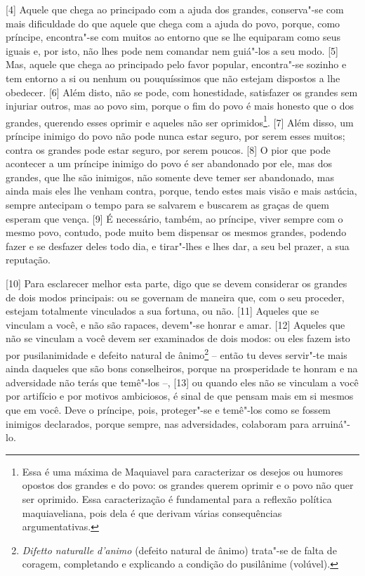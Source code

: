 {[}4{]} Aquele que chega ao principado com a ajuda dos grandes,
conserva"-se com mais dificuldade do que aquele que chega com a ajuda do
povo, porque, como príncipe, encontra"-se com muitos ao entorno que se
lhe equiparam como seus iguais e, por isto, não lhes pode nem comandar
nem guiá"-los a seu modo. {[}5{]} Mas, aquele que chega ao principado
pelo favor popular, encontra"-se sozinho e tem entorno a si ou nenhum ou
pouquíssimos que não estejam dispostos a lhe obedecer. {[}6{]} Além
disto, não se pode, com honestidade, satisfazer os grandes sem injuriar
outros, mas ao povo sim, porque o fim do povo é mais honesto que o dos
grandes, querendo esses oprimir e aqueles não ser oprimidos\footnote{Essa
  é uma máxima de Maquiavel para caracterizar os desejos ou humores
  opostos dos grandes e do povo: os grandes querem oprimir e o povo não
  quer ser oprimido. Essa caracterização é fundamental para a reflexão
  política maquiaveliana, pois dela é que derivam várias consequências
  argumentativas.}. {[}7{]} Além disso, um príncipe inimigo do povo não
pode nunca estar seguro, por serem esses muitos; contra os grandes pode
estar seguro, por serem poucos. {[}8{]} O pior que pode acontecer a um
príncipe inimigo do povo é ser abandonado por ele, mas dos grandes, que
lhe são inimigos, não somente deve temer ser abandonado, mas ainda mais
eles lhe venham contra, porque, tendo estes mais visão e mais astúcia,
sempre antecipam o tempo para se salvarem e buscarem as graças de quem
esperam que vença. {[}9{]} É necessário, também, ao príncipe, viver
sempre com o mesmo povo, contudo, pode muito bem dispensar os mesmos
grandes, podendo fazer e se desfazer deles todo dia, e tirar"-lhes e lhes
dar, a seu bel prazer, a sua reputação.

{[}10{]} Para esclarecer melhor esta parte, digo que se devem considerar
os grandes de dois modos principais: ou se governam de maneira que, com
o seu proceder, estejam totalmente vinculados a sua fortuna, ou não.
{[}11{]} Aqueles que se vinculam a você, e não são rapaces, devem"-se
honrar e amar. {[}12{]} Aqueles que não se vinculam a você devem ser
examinados de dois modos: ou eles fazem isto por pusilanimidade e
defeito natural de ânimo\footnote{\emph{Difetto naturalle d'animo}
  (defeito natural de ânimo) trata"-se de falta de coragem, completando e
  explicando a condição do pusilânime (volúvel).} -- então tu deves
servir"-te mais ainda daqueles que são bons conselheiros, porque na
prosperidade te honram e na adversidade não terás que temê"-los --,
{[}13{]} ou quando eles não se vinculam a você por artifício e por
motivos ambiciosos, é sinal de que pensam mais em si mesmos que em você.
Deve o príncipe, pois, proteger"-se e temê"-los como se fossem inimigos
declarados, porque sempre, nas adversidades, colaboram para arruiná"-lo.

